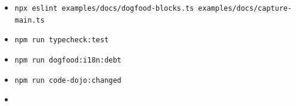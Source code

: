 \begin{itemize}
\tightlist
\item
  \texttt{n\allowbreak{}p\allowbreak{}x\allowbreak{} \allowbreak{}e\allowbreak{}s\allowbreak{}l\allowbreak{}i\allowbreak{}n\allowbreak{}t\allowbreak{} \allowbreak{}e\allowbreak{}x\allowbreak{}a\allowbreak{}m\allowbreak{}p\allowbreak{}l\allowbreak{}e\allowbreak{}s\allowbreak{}/\allowbreak{}d\allowbreak{}o\allowbreak{}c\allowbreak{}s\allowbreak{}/\allowbreak{}d\allowbreak{}o\allowbreak{}g\allowbreak{}f\allowbreak{}o\allowbreak{}o\allowbreak{}d\allowbreak{}-\allowbreak{}b\allowbreak{}l\allowbreak{}o\allowbreak{}c\allowbreak{}k\allowbreak{}s\allowbreak{}.\allowbreak{}t\allowbreak{}s\allowbreak{} \allowbreak{}e\allowbreak{}x\allowbreak{}a\allowbreak{}m\allowbreak{}p\allowbreak{}l\allowbreak{}e\allowbreak{}s\allowbreak{}/\allowbreak{}d\allowbreak{}o\allowbreak{}c\allowbreak{}s\allowbreak{}/\allowbreak{}c\allowbreak{}a\allowbreak{}p\allowbreak{}t\allowbreak{}u\allowbreak{}r\allowbreak{}e\allowbreak{}-\allowbreak{}m\allowbreak{}a\allowbreak{}i\allowbreak{}n\allowbreak{}.\allowbreak{}t\allowbreak{}s}
\item
  \texttt{n\allowbreak{}p\allowbreak{}m\allowbreak{} \allowbreak{}r\allowbreak{}u\allowbreak{}n\allowbreak{} \allowbreak{}t\allowbreak{}y\allowbreak{}p\allowbreak{}e\allowbreak{}c\allowbreak{}h\allowbreak{}e\allowbreak{}c\allowbreak{}k\allowbreak{}:\allowbreak{}t\allowbreak{}e\allowbreak{}s\allowbreak{}t}
\item
  \texttt{n\allowbreak{}p\allowbreak{}m\allowbreak{} \allowbreak{}r\allowbreak{}u\allowbreak{}n\allowbreak{} \allowbreak{}d\allowbreak{}o\allowbreak{}g\allowbreak{}f\allowbreak{}o\allowbreak{}o\allowbreak{}d\allowbreak{}:\allowbreak{}i\allowbreak{}1\allowbreak{}8\allowbreak{}n\allowbreak{}:\allowbreak{}d\allowbreak{}e\allowbreak{}b\allowbreak{}t}
\item
  \texttt{n\allowbreak{}p\allowbreak{}m\allowbreak{} \allowbreak{}r\allowbreak{}u\allowbreak{}n\allowbreak{} \allowbreak{}c\allowbreak{}o\allowbreak{}d\allowbreak{}e\allowbreak{}-\allowbreak{}d\allowbreak{}o\allowbreak{}j\allowbreak{}o\allowbreak{}:\allowbreak{}c\allowbreak{}h\allowbreak{}a\allowbreak{}n\allowbreak{}g\allowbreak{}e\allowbreak{}d}
\item

\end{itemize}
